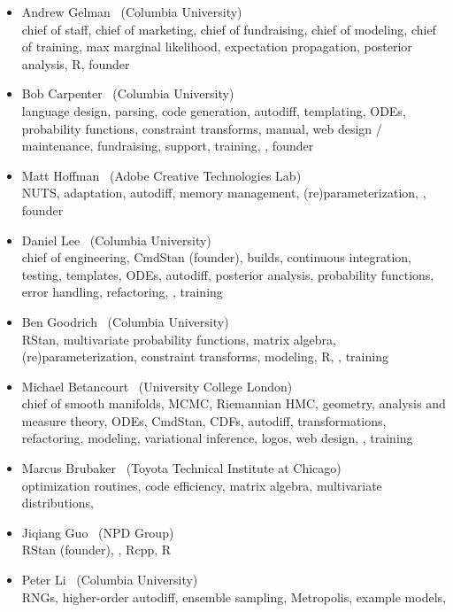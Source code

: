 \begin{itemize}
\item Andrew Gelman \ (Columbia University)
\\ {\footnotesize chief of staff, chief of marketing, chief of
  fundraising, chief of modeling, chief of training, max marginal
  likelihood, expectation propagation, posterior analysis, R, founder}
\item Bob Carpenter \ (Columbia University) \\ {\footnotesize language
    design, parsing, code generation, autodiff, templating, ODEs,
    probability functions, constraint transforms, manual, web design /
    maintenance, fundraising, support, training, \Cpp, founder}
\item Matt Hoffman \ (Adobe Creative Technologies Lab)
\\ {\footnotesize NUTS, adaptation, autodiff, memory management,
  (re)parameterization, \Cpp, founder}
\item Daniel Lee \   (Columbia University)
\\ {\footnotesize chief of engineering, CmdStan (founder), builds, continuous
  integration, testing, templates, ODEs, autodiff,
  posterior analysis, probability functions, error handling,
  refactoring, \Cpp, training}
\item Ben Goodrich \   (Columbia University)
\\ {\footnotesize RStan, multivariate probability functions, matrix algebra,
  (re)parameterization, constraint transforms, modeling, R, \Cpp, training}
\item Michael Betancourt \ (University College London) \\
  {\footnotesize chief of smooth manifolds, MCMC, Riemannian HMC,
    geometry, analysis and measure theory, ODEs, CmdStan, CDFs,
    autodiff, transformations, refactoring, modeling, variational
    inference, logos, web design, \Cpp, training}
\item Marcus Brubaker \   (Toyota Technical Institute at Chicago)
\\ {\footnotesize optimization routines, code efficiency, matrix
  algebra, multivariate distributions, \Cpp}
\item Jiqiang Guo \   (NPD Group)
\\ {\footnotesize RStan (founder), \Cpp, Rcpp, R}
\item Peter Li \   (Columbia University)
\\ {\footnotesize RNGs, higher-order autodiff, ensemble sampling,
  Metropolis, example models, \Cpp}

\end{itemize}
